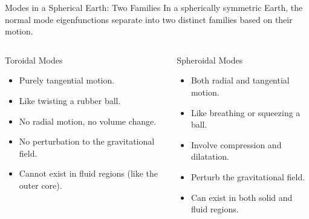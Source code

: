 \documentclass{beamer}
\begin{document}
\begin{frame}{Modes in a Spherical Earth: Two Families}
    In a spherically symmetric Earth, the normal mode eigenfunctions separate into two distinct families based on their motion.
    \begin{columns}
        \begin{block}{Toroidal Modes}
            \begin{itemize}
                \item Purely tangential motion.
                \item Like twisting a rubber ball.
                \item No radial motion, no volume change.
                \item No perturbation to the gravitational field.
                \item Cannot exist in fluid regions (like the outer core).
            \end{itemize}
        \end{block}
        \begin{block}{Spheroidal Modes}
            \begin{itemize}
                \item Both radial and tangential motion.
                \item Like breathing or squeezing a ball.
                \item Involve compression and dilatation.
                \item Perturb the gravitational field.
                \item Can exist in both solid and fluid regions.
            \end{itemize}
        \end{block}
    \end{columns}
\end{frame}
\end{document}
